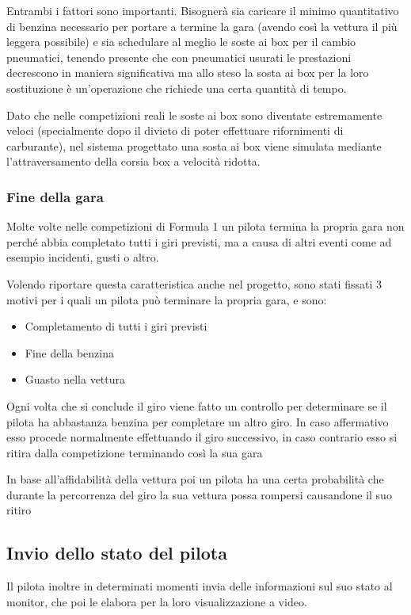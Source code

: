 \documentclass[a4paper,11pt, twoside]{book}
\begin{document}
	  Entrambi i fattori sono importanti. Bisognerà sia caricare il minimo quantitativo di benzina necessario per
	  portare a termine la gara (avendo così la vettura il più leggera possibile) e sia
	  schedulare al meglio le soste ai box per il cambio pneumatici, tenendo presente che con pneumatici usurati le prestazioni
	  decrescono in maniera significativa ma allo steso la sosta ai box per la loro sostituzione è un'operazione
	  che richiede una certa quantità di tempo.
	  
	  Dato che nelle competizioni reali le soste ai box sono diventate estremamente veloci (specialmente dopo il divieto di poter
	  effettuare rifornimenti di carburante),
	  nel sistema progettato una sosta ai box viene simulata mediante l'attraversamento della corsia box a velocità ridotta.
	  
	\subsubsection{Fine della gara}
	  Molte volte nelle competizioni di Formula 1 un pilota termina la propria gara non perché
	  abbia completato tutti i giri previsti, ma a causa di altri eventi come ad esempio incidenti,
	  gusti o altro.
	  
	  Volendo riportare questa caratteristica anche nel progetto, sono stati fissati 3 motivi per i quali un 
	  pilota può terminare la propria gara, e sono:
	  
	  \begin{itemize}
	   \item Completamento di tutti i giri previsti
	   \item Fine della benzina
	   \item Guasto nella vettura
	  \end{itemize}
	  
	  Ogni volta che si conclude il giro viene fatto un controllo per determinare se il pilota
	  ha abbastanza benzina per completare un altro giro. In caso affermativo esso procede normalmente
	  effettuando il giro successivo, in caso contrario esso si ritira dalla competizione terminando così la sua gara
	  
	  In base all'affidabilità della vettura poi un pilota ha una certa probabilità che durante la percorrenza del giro
	  la sua vettura possa rompersi causandone il suo ritiro
	
      \subsection{Invio dello stato del pilota}
	Il pilota inoltre in determinati momenti invia delle informazioni sul suo stato al monitor, 
	che poi le elabora per la loro visualizzazione a video.
	
\end{document}
